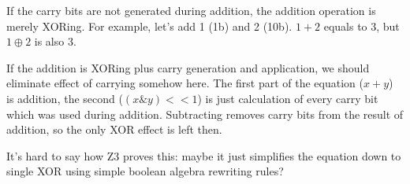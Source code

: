 If the carry bits are not generated during addition, the addition operation is merely XORing.
For example, let's add 1 (1b) and 2 (10b). $1 + 2$ equals to 3, but $1 \oplus 2$ is also 3.

If the addition is XORing plus carry generation and application, we should eliminate effect of carrying somehow here.
The first part of the equation ($x + y$) is addition, the second ($(x \& y)<<1$) is just calculation of every carry bit which was used during addition.
Subtracting removes carry bits from the result of addition, so the only XOR effect is left then.

It's hard to say how Z3 proves this: maybe it just simplifies the equation down to single XOR using simple boolean algebra rewriting rules?

